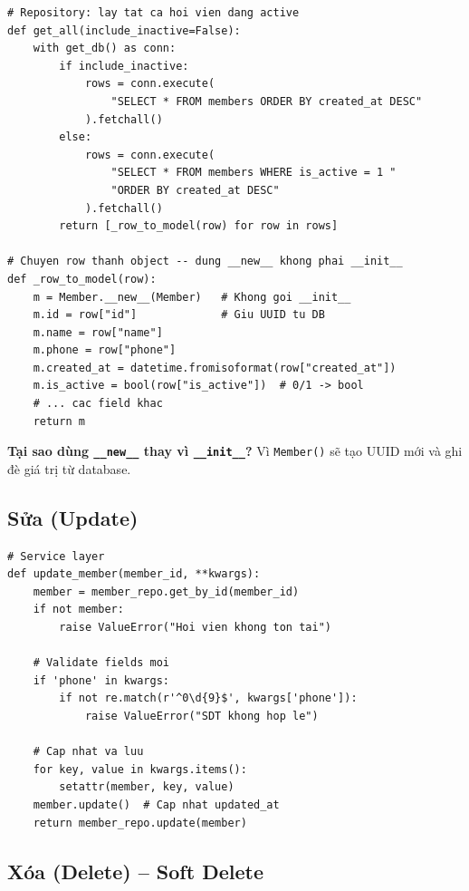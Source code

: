 \documentclass[12pt,a4paper]{article}
\begin{document}
\begin{lstlisting}[style=pythonstyle, caption={Lấy danh sách hội viên}]
# Repository: lay tat ca hoi vien dang active
def get_all(include_inactive=False):
    with get_db() as conn:
        if include_inactive:
            rows = conn.execute(
                "SELECT * FROM members ORDER BY created_at DESC"
            ).fetchall()
        else:
            rows = conn.execute(
                "SELECT * FROM members WHERE is_active = 1 "
                "ORDER BY created_at DESC"
            ).fetchall()
        return [_row_to_model(row) for row in rows]

# Chuyen row thanh object -- dung __new__ khong phai __init__
def _row_to_model(row):
    m = Member.__new__(Member)   # Khong goi __init__
    m.id = row["id"]             # Giu UUID tu DB
    m.name = row["name"]
    m.phone = row["phone"]
    m.created_at = datetime.fromisoformat(row["created_at"])
    m.is_active = bool(row["is_active"])  # 0/1 -> bool
    # ... cac field khac
    return m
\end{lstlisting}

\textbf{Tại sao dùng \texttt{\_\_new\_\_} thay vì \texttt{\_\_init\_\_}?} Vì \texttt{Member()} sẽ tạo UUID mới và ghi đè giá trị từ database.

\subsection{Sửa (Update)}

\begin{lstlisting}[style=pythonstyle, caption={Cập nhật thông tin hội viên}]
# Service layer
def update_member(member_id, **kwargs):
    member = member_repo.get_by_id(member_id)
    if not member:
        raise ValueError("Hoi vien khong ton tai")

    # Validate fields moi
    if 'phone' in kwargs:
        if not re.match(r'^0\d{9}$', kwargs['phone']):
            raise ValueError("SDT khong hop le")

    # Cap nhat va luu
    for key, value in kwargs.items():
        setattr(member, key, value)
    member.update()  # Cap nhat updated_at
    return member_repo.update(member)
\end{lstlisting}

\subsection{Xóa (Delete) -- Soft Delete}
\end{document}
